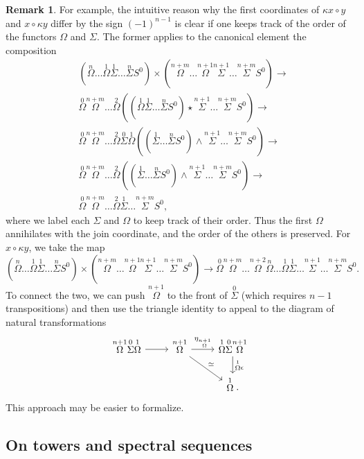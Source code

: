 \documentclass{amsart}
\theoremstyle{definition}
\newtheorem{re}[theorem]{Remark}
\newcommand{\join}{\star}
\newcommand{\onum}[1]{\stackrel{#1}{\Omega}}
\newcommand{\snum}[1]{\stackrel{#1}{\Sigma}}
\begin{document}
\begin{re}
    For example, the intuitive reason why the first coordinates of $\kappa x \circ y$ and $x \circ \kappa y$ differ by the sign $(-1)^{n-1}$ is clear if one keeps track of the order of the functors $\Omega$ and $\Sigma$. The former applies to the canonical element the composition
    \begin{align*}
    &(\onum{n} \ldots \onum{1} \snum{1} \ldots \snum{n} S^0) \times (\onum{n+m} \ldots \onum{n+1}  \snum{n+1} \ldots \snum{n+m} S^0) \to \\
    &\onum{0}\onum{n+m} \ldots \onum{2} ((\onum{1} \snum{1}\ldots \snum{n} S^0) \join \snum{n+1} \ldots \snum{n+m} S^0) \to \\
    &\onum{0}\onum{n+m} \ldots \onum{2} \snum{0} \onum{1} ((\snum{1}\ldots \snum{n} S^0) \wedge \snum{n+1} \ldots \snum{n+m} S^0) \to \\
    &\onum{0}\onum{n+m} \ldots \onum{2}  ((\snum{1}\ldots \snum{n} S^0) \wedge \snum{n+1} \ldots \snum{n+m} S^0) \to \\
    & \onum{0}\onum{n+m} \ldots \onum{2}  \snum{1} \ldots \snum{n+m} S^0,
    \end{align*}
    where we label each $\Sigma$ and $\Omega$ to keep track of their order.
    Thus the first $\Omega$ annihilates with the join coordinate, and the order of the others is preserved.
    For $x \circ \kappa y$, we take the map
    $$(\onum{n} \ldots \onum{1} \snum{1} \ldots \snum{n} S^0) \times (\onum{n+m} \ldots \onum{n+1}  \snum{n+1} \ldots \snum{n+m} S^0) \to \onum{0}\onum{n+m} \ldots \onum{n+2} \onum{n} \ldots \onum{1}  \snum{1}\ldots \snum{n+1} \ldots \snum{n+m} S^0.$$
    To connect the two, we can push $\onum{n+1}$ to the front of $\snum{0}$ (which requires $n-1$ transpositions) and then use the triangle identity to appeal to the diagram of natural transformations
    \[\begin{tikzcd}
    	{\onum{n+1} \snum{0}  \onum{1}} & {\onum{n+1}} & {\onum{1} \snum{0}  \onum{n+1} } \\
    	&& {\onum{1}.}
    	\arrow[from=1-1, to=1-2]
    	\arrow["{\eta_{\onum{n+1}}}", from=1-2, to=1-3]
    	\arrow["\simeq", from=1-2, to=2-3]
    	\arrow["{\onum{1}\epsilon}", from=1-3, to=2-3]
    \end{tikzcd}\]
    This approach may be easier to formalize.
\end{re}



\subsection{On towers and spectral sequences}\label{pairing_on_towers}
\end{document}

